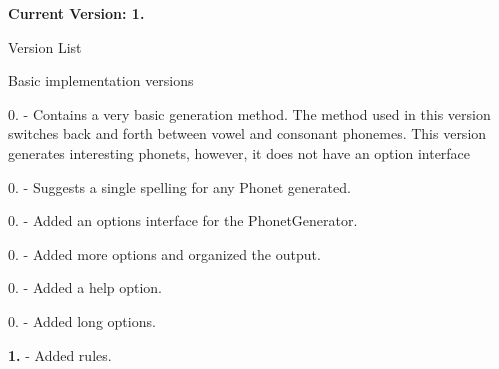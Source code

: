 {\bfseries Current Version\+: 1.}

Version List
\begin{DoxyItemize}
\item Basic implementation versions
\item 0. -\/ Contains a very basic generation method. The method used in this version switches back and forth between vowel and consonant phonemes. This version generates interesting phonets, however, it does not have an option interface
\item 0. -\/ Suggests a single spelling for any Phonet generated.
\item 0. -\/ Added an options interface for the Phonet\+Generator.
\item 0. -\/ Added more options and organized the output.
\item 0. -\/ Added a help option.
\item 0. -\/ Added long options.
\item {\bfseries 1.} -\/ Added rules. 
\end{DoxyItemize}